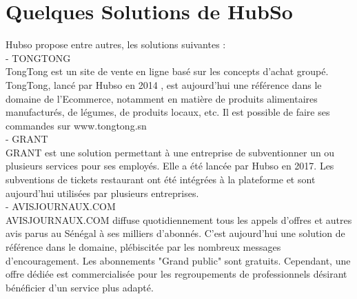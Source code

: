 \section{Quelques Solutions de HubSo }
Hubso propose entre autres, les solutions suivantes : \\
- TONGTONG \\
TongTong est un site de vente en ligne basé sur les concepts d'achat groupé. TongTong, lancé par Hubso en 2014 , est aujourd'hui une référence dans le domaine de l'Ecommerce, notamment en matière de produits alimentaires manufacturés, de légumes, de produits locaux, etc. Il est possible de faire ses commandes sur www.tongtong.sn \\
- GRANT \\
GRANT est une solution permettant à une entreprise de subventionner un ou plusieurs services pour ses employés. Elle a été lancée par Hubso en 2017. Les subventions de tickets restaurant ont été intégrées à la plateforme et sont aujourd'hui utilisées par plusieurs entreprises.\\
- AVISJOURNAUX.COM \\
AVISJOURNAUX.COM diffuse quotidiennement tous les appels d'offres et autres avis parus au Sénégal à ses milliers d'abonnés. C'est aujourd'hui une solution de référence dans le domaine, plébiscitée par les nombreux messages d'encouragement. Les abonnements "Grand public" sont gratuits. Cependant, une offre dédiée est commercialisée pour les regroupements de professionnels désirant bénéficier d'un service plus adapté. 

